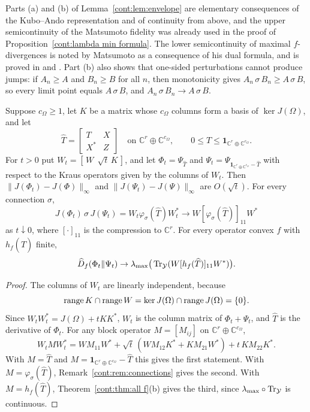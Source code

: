 \begin{remark}\label{cont:rem:one sided}
Parts (a) and (b) of Lemma~\ref{cont:lem:envelope} are elementary consequences of the Kubo--Ando representation and of continuity from above, and the upper semicontinuity of the Matsumoto fidelity was already used in the proof of Proposition~\ref{cont:lambda min formula}. The lower semicontinuity of maximal $f$-divergences is noted by Matsumoto \cite{Matsumoto2018newf} as a consequence of his dual formula, and is proved in \cite[Section~5]{Hiai2019maximal} and \cite[Theorem~A.4]{MosonyiHiai2024}. Part (b) also shows that one-sided perturbations cannot produce jumps: if $A_n\geq A$ and $B_n\geq B$ for all $n$, then monotonicity gives $A_n\,\sigma\,B_n\geq A\,\sigma\,B$, so every limit point equals $A\,\sigma\,B$, and $A_n\,\sigma\,B_n\to A\,\sigma\,B$.
\end{remark}

\begin{lemma}\label{cont:lem:dilation}
Suppose $c_\Omega\geq1$, let $K$ be a matrix whose $c_\Omega$ columns form a basis of $\ker J(\Omega)$, and let
\[
\widehat T=\begin{bmatrix}T&X\\X^*&Z\end{bmatrix}\quad\text{on }\mathbb{C}^r\oplus\mathbb{C}^{c_\Omega},\qquad0\leq\widehat T\leq\mathbf{1}_{\mathbb{C}^r\oplus\mathbb{C}^{c_\Omega}}.
\]
For $t>0$ put $W_t=[\,W\ \ \sqrt t\,K\,]$, and let $\Phi_t=\Psi_{\widehat T}$ and $\Psi_t=\Psi_{\mathbf{1}_{\mathbb{C}^r\oplus\mathbb{C}^{c_\Omega}}-\widehat T}$ with respect to the Kraus operators given by the columns of $W_t$. Then $\|J(\Phi_t)-J(\Phi)\|_\infty$ and $\|J(\Psi_t)-J(\Psi)\|_\infty$ are $O(\sqrt t)$. For every connection $\sigma$,
\[
J(\Phi_t)\,\sigma\,J(\Psi_t)=W_t\varphi_\sigma(\widehat T)W_t^*\to W[\varphi_\sigma(\widehat T)]_{11}W^*
\]
as $t\downarrow0$, where $[\cdot]_{11}$ is the compression to $\mathbb{C}^r$. For every operator convex $f$ with $h_f(\widehat T)$ finite,
\[
\widehat D_f(\Phi_t\|\Psi_t)\to\lambda_{\max}\big(\operatorname{Tr}_{\mathcal{Y}}(W[h_f(\widehat T)]_{11}W^*)\big).
\]
\end{lemma}

\begin{proof}
The columns of $W_t$ are linearly independent, because
\[
\operatorname{range} K\cap\operatorname{range} W=\ker J(\Omega)\cap\operatorname{range} J(\Omega)=\{0\}.
\]
Since $W_tW_t^*=J(\Omega)+tK K^*$, $W_t$ is the column matrix of $\Phi_t+\Psi_t$, and $\widehat T$ is the derivative of $\Phi_t$. For any block operator $M=[M_{ij}]$ on $\mathbb{C}^r\oplus\mathbb{C}^{c_\Omega}$,
\[
W_tMW_t^*=WM_{11}W^*+\sqrt t\,(WM_{12}K^*+K M_{21}W^*)+t\,K M_{22}K^* .
\]
With $M=\widehat T$ and $M=\mathbf{1}_{\mathbb{C}^r\oplus\mathbb{C}^{c_\Omega}}-\widehat T$ this gives the first statement. With $M=\varphi_\sigma(\widehat T)$, Remark~\ref{cont:rem:connections} gives the second. With $M=h_f(\widehat T)$, Theorem~\ref{cont:thm:all f}(b) gives the third, since $\lambda_{\max}\circ\operatorname{Tr}_{\mathcal{Y}}$ is continuous.
\end{proof}

